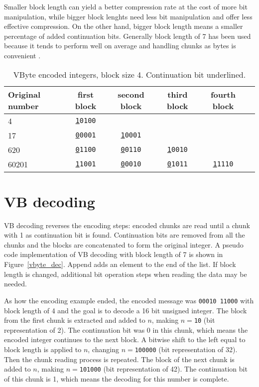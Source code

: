 Smaller block length can yield a better compression rate at the cost of more bit manipulation, while bigger block lenghts need less bit manipulation and 
offer less effective compression. On the other hand, bigger block length means a smaller percentage of added continuation bits.
Generally block length of 7 has been used because it tends to perform well on average and handling chunks as bytes is 
convenient \citep{Man08}.


\begin{table}
\centering
\begin{tabular}{l||c c c c c} 
Original number & first block & second block & third block & fourth block &\\ 
\hline \hline 
4  & \texttt{\underline{1}0100}    &                             &                           &  &  \\
17  & \texttt{\underline{0}0001}   & \texttt{\underline{1}0001}  &                           &  &  \\
620  & \texttt{\underline{0}1100}  & \texttt{\underline{0}0110} & \texttt{\underline{1}0010} &  &  \\
60201 & \texttt{\underline{1}1001} & \texttt{\underline{0}0010} & \texttt{\underline{0}1011} & \texttt{\underline{1}1110} &  \\

\hline
\end{tabular}
\caption{VByte encoded integers, block size 4. Continuation bit underlined.\label{table:vbytes}}
\end{table}

\section{VB decoding}
VB decoding reverses the encoding steps: encoded chunks are read until a chunk with 1 as continuation bit is found. Continuation bits 
are removed from all the chunks and the blocks are concatenated to form the original integer. A pseudo code implementation of VB decoding with block length of 7 is shown in Figure~\ref{vbyte_dec}.
Append adds an element to the end of the list. If block length is changed, additional bit operation steps when reading the data may be needed.

As how the encoding example ended, the encoded message was \texttt{00010 11000} with block length of 4 and the goal is to decode a 16 bit unsigned integer. The block from the first chunk is 
extracted and added to $n$, making $n = $\texttt{10} (bit representation of 2).
The continuation bit was 0 in this chunk, which means the encoded integer continues to the next block. A bitwise shift to the left equal to block length is applied to $n$, 
changing $n = $\texttt{100000} (bit representation of 32). Then the chunk reading process is repeated. The block of the next chunk is added to $n$, making 
$n = $\texttt{101000} (bit representation of 42). The continuation bit of this chunk is 1, which means the decoding for this number is complete. 

